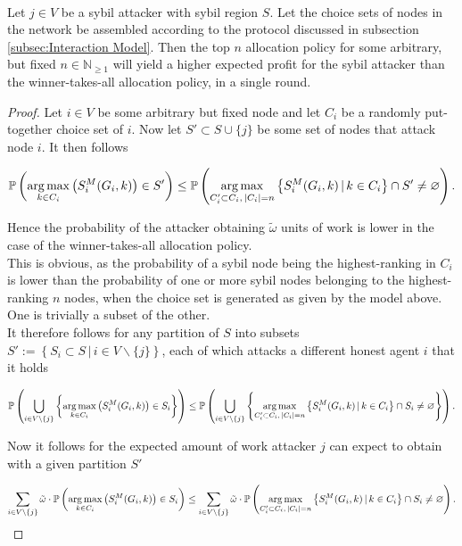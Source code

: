 \begin{proposition}[]\ \\
\label{prop:Top-n probability is larger than Winner-takes-all}
\noindent{}Let $j\in{}V$ be a sybil attacker with sybil region $S$. Let the choice sets of nodes in the network be assembled according to the protocol discussed in subsection \ref{subsec:Interaction Model}. Then the top $n$ allocation policy for some arbitrary, but fixed $n\in\mathbb{N}_{\geq{}1}$ will yield a higher expected profit for the sybil attacker than the winner-takes-all allocation policy, in a single round.
\end{proposition}
\begin{proof}
\noindent{}Let $i\in{}V$ be some arbitrary but fixed node and let $C_i$ be a randomly put-together choice set of $i$. Now let $S'\subset{}S\cup\lbrace{}j\rbrace$ be some set of nodes that attack node $i$. It then follows

\[
\mathbb{P}\left(\operatorname*{arg\,max}\limits_{k\in{}C_i}\left(S_i^M(G_i,k)\right)\in{}S'\right) \leq \mathbb{P}\left(\operatorname*{arg\,max}\limits_{C_i'\subset{}C_i,\,|C_i|=n}\left\lbrace{}S_i^M(G_i,k)\,|\,k\in{}C_i\right\rbrace\cap{}S' \neq \varnothing\right).
\]

\noindent{}Hence the probability of the attacker obtaining $\tilde{\omega}$ units of work is lower in the case of the winner-takes-all allocation policy.\vspace{1em}\\

\noindent{}This is obvious, as the probability of a sybil node being the highest-ranking in $C_i$ is lower than the probability of one or more sybil nodes belonging to the highest-ranking $n$ nodes, when the choice set is generated as given by the model above. One is trivially a subset of the other. \vspace{1em}\\

\noindent{}It therefore follows for any partition of $S$ into subsets $S':=\left\lbrace{}S_i\subset{}S\,|\,i\in{}V\backslash\lbrace{}j\rbrace\right\rbrace$, each of which attacks a different honest agent $i$ that it holds

\[
\mathbb{P}\left(\bigcup\limits_{i\in{}V\backslash\lbrace{}j\rbrace}\left\lbrace\argmax\limits_{k\in{}C_i}\left(S_i^M(G_i,k)\right)\in{}S_i\right\rbrace\right) \leq \mathbb{P}\left(\bigcup\limits_{i\in{}V\backslash\lbrace{}j\rbrace}\left\lbrace\argmax\limits_{C_i'\subset{}C_i,\,|C_i|=n}\left\lbrace{}S_i^M(G_i,k)\,|\,k\in{}C_i\right\rbrace\cap{}S_i\neq\varnothing\right\rbrace\right). \vspace{1em}\\
\]

\noindent{}Now it follows for the expected amount of work attacker $j$ can expect to obtain with a given partition $S'$

\[
\sum\limits_{i\in{}V\backslash\lbrace{}j\rbrace}\tilde{\omega}\cdot\mathbb{P}\left(\operatorname*{arg\,max}\limits_{k\in{}C_i}\left(S_i^M(G_i,k)\right)\in{}S_i\right) \leq \sum\limits_{i\in{}V\backslash\lbrace{}j\rbrace}\tilde{\omega}\cdot\mathbb{P}\left(\operatorname*{arg\,max}\limits_{C_i'\subset{}C_i,\,|C_i|=n}\left\lbrace{}S_i^M(G_i,k)\,|\,k\in{}C_i\right\rbrace\cap{}S_i\neq\varnothing\right).
\]
\end{proof}

